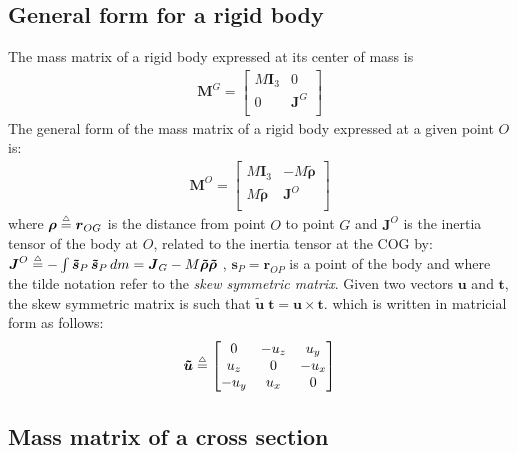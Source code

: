 \documentclass[11pt]{article}
\renewcommand{\v}[1]{\boldsymbol{#1}}
\newcommand{\m}[1]{\boldsymbol{#1}}
\newcommand{\eqdef}{\stackrel{\mathsmaller{\mathsmaller{\mathsmaller{\triangle}}}}{=}}
\newcommand{\rhotil}{\m{\tilde{\rho}}}
\newcommand{\stil}  {\m{\tilde{s}}}
\begin{document}
\subsection{General form for a rigid body}
The mass matrix of a rigid body expressed at its center of mass is 
\begin{align}
\m{M}^G=
    \begin{bmatrix}
        M\m{I}_3 & 0  \\
        0  &  \m{J}^{G}  \\
    \end{bmatrix}
\end{align}
The general form of the mass matrix of a rigid body expressed at a given point $O$ is:
\begin{align}
\m{M}^O=
    \begin{bmatrix}
        M\m{I}_3 & -M \rhotil  \\
        M \rhotil  &  \m{J}^{O}  \\
    \end{bmatrix}
\end{align}
where
$\v{\rho}\eqdef \v{r}_{{O}G}$ is the distance from point $O$ to point $G$ and 
$\m{J}^{O}$ is the inertia tensor of the body at $O$, related to the inertia tensor at the COG by:
$
    \m{J}^{O}\eqdef - \int \stil_{P}\, \stil_{P}\, dm 
=\m{J}_G-M \rhotil\rhotil
$
,  $\v{s}_P=\v{r}_{OP}$ is a point of the body
and  where the tilde notation refer to the \textit{skew symmetric matrix}.
Given two vectors $\v{u}$ and $\v{t}$, the skew symmetric matrix is such that $\tilde{\v{u}}\; \v{t}  =\v{u}\times\v{t}$.
which is written in matricial form as follows:
\begin{align}
        \v{\tilde{u}} \eqdef 
    \begin{bmatrix}
        0    & -u_z & u_y \\
        u_z  & 0    & -u_x \\
        -u_y & u_x & 0 \\
    \end{bmatrix}  %
\end{align}



\subsection{Mass matrix of a cross section}
\end{document}
